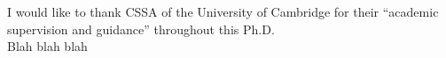 \begin{acknowledgements}      

I would like to thank CSSA of the University of Cambridge for their ``academic supervision and guidance'' throughout this Ph.D.\\

Blah blah blah

\end{acknowledgements}
